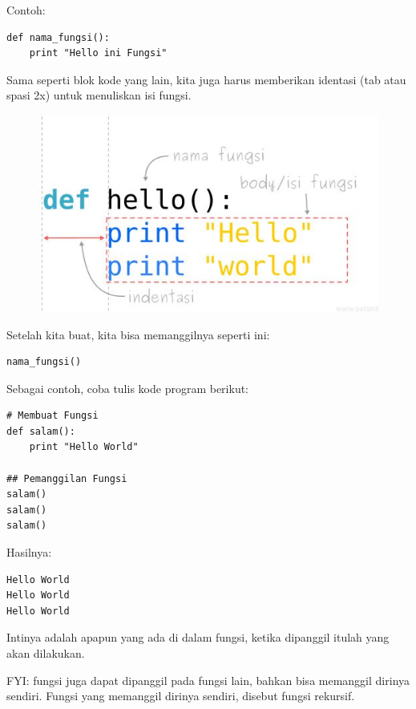 Contoh: \begin{lstlisting}
def nama_fungsi():
    print "Hello ini Fungsi"
\end{lstlisting}
 Sama seperti blok kode yang lain, kita juga harus memberikan identasi (tab atau spasi 2x) untuk menuliskan isi fungsi.
\newpage \begin{figure}[!htbp]
    \centering
    \includegraphics[scale=0.5]{figures/p2}
    \label{fungsi}
\end{figure}
\par Setelah kita buat, kita bisa memanggilnya seperti ini:
\begin{lstlisting}
nama_fungsi()
\end{lstlisting}
Sebagai contoh, coba tulis kode program berikut:
\begin{lstlisting}
# Membuat Fungsi
def salam():
    print "Hello World"

## Pemanggilan Fungsi
salam()
salam()
salam()
\end{lstlisting}
Hasilnya:
\begin{lstlisting}
Hello World
Hello World
Hello World
\end{lstlisting}
Intinya adalah apapun yang ada di dalam fungsi, ketika dipanggil itulah yang akan dilakukan.
\par FYI: fungsi juga dapat dipanggil pada fungsi lain, bahkan bisa memanggil dirinya sendiri. Fungsi yang memanggil dirinya sendiri, disebut fungsi rekursif.
